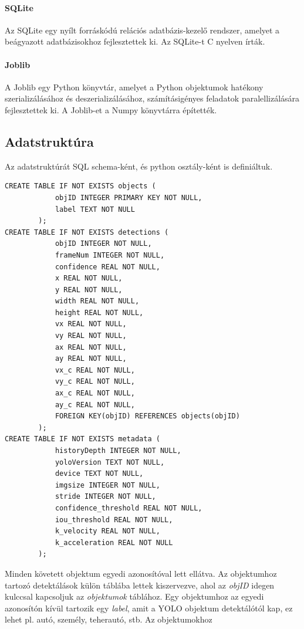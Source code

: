 \documentclass[12pt,a4paper]{article}
\begin{document}
\paragraph{SQLite} Az SQLite egy nyílt forráskódú relációs adatbázis-kezelő rendszer, amelyet a beágyazott adatbázisokhoz fejlesztettek ki. Az SQLite-t C nyelven írták.
\paragraph{Joblib} A Joblib egy Python könyvtár, amelyet a Python objektumok hatékony szerializálásához és deszerializálásához, számításigényes feladatok paralellizálására fejlesztettek ki. A Joblib-et a Numpy könyvtárra építették.

\newpage
\subsection{Adatstruktúra}
Az adatstruktúrát SQL schema-ként, és python osztály-ként is definiáltuk.
\begin{verbatim}
CREATE TABLE IF NOT EXISTS objects (
            objID INTEGER PRIMARY KEY NOT NULL,
            label TEXT NOT NULL
        );
CREATE TABLE IF NOT EXISTS detections (
            objID INTEGER NOT NULL,
            frameNum INTEGER NOT NULL,
            confidence REAL NOT NULL,
            x REAL NOT NULL,
            y REAL NOT NULL,
            width REAL NOT NULL,
            height REAL NOT NULL,
            vx REAL NOT NULL,
            vy REAL NOT NULL,
            ax REAL NOT NULL,
            ay REAL NOT NULL,
            vx_c REAL NOT NULL,
            vy_c REAL NOT NULL,
            ax_c REAL NOT NULL,
            ay_c REAL NOT NULL,
            FOREIGN KEY(objID) REFERENCES objects(objID)
        );
CREATE TABLE IF NOT EXISTS metadata (
            historyDepth INTEGER NOT NULL,
            yoloVersion TEXT NOT NULL,   
            device TEXT NOT NULL,
            imgsize INTEGER NOT NULL,
            stride INTEGER NOT NULL,
            confidence_threshold REAL NOT NULL,
            iou_threshold REAL NOT NULL,
            k_velocity REAL NOT NULL,
            k_acceleration REAL NOT NULL
        );
\end{verbatim}
Minden követett objektum egyedi azonosítóval lett ellátva. Az objektumhoz tartozó detektálások külön táblába lettek kiszervezve,
ahol az \textit{objID} idegen kulccsal kapcsoljuk az \textit{objektumok} táblához. Egy objektumhoz az egyedi azonosítón kívül
tartozik egy \textit{label}, amit a YOLO objektum detektálótól kap, ez lehet pl. autó, személy, teherautó, stb. Az objektumokhoz
\end{document}
